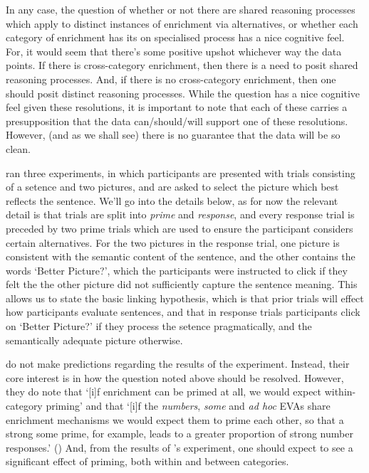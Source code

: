 \documentclass[10pt]{article}
\begin{document}
\begin{multicols}{2}
In any case, the question of whether or not there are shared reasoning processes which apply to distinct instances of enrichment via alternatives, or whether each category of enrichment has its on specialised process has a nice cognitive feel.
For, it would seem that there's some positive upshot whichever way the data points.
If there is cross-category enrichment, then there is a need to posit shared reasoning processes.
And, if there is no cross-category enrichment, then one should posit distinct reasoning processes.
While the question has a nice cognitive feel given these resolutions, it is important to note that each of these carries a presupposition that the data can/should/will support one of these resolutions.
However, (and as we shall see) there is no guarantee that the data will be so clean.

\citeauthor{Bott:2016aa} ran three experiments, in which participants are presented with trials consisting of a setence and two pictures, and are asked to select the picture which best reflects the sentence.
We'll go into the details below, as for now the relevant detail is that trials are split into \emph{prime} and \emph{response}, and every response trial is preceded by two prime trials which are used to ensure the participant considers certain alternatives.
For the two pictures in the response trial, one picture is consistent with the semantic content of the sentence, and the other contains the words `Better Picture?', which the participants were instructed to click if they felt the the other picture did not sufficiently capture the sentence meaning.
This allows us to state the basic linking hypothesis, which is that prior trials will effect how participants evaluate sentences, and that in response trials participants click on `Better Picture?' if they process the setence pragmatically, and the semantically adequate picture otherwise.

\citeauthor{Bott:2016aa} do not make predictions regarding the results of the experiment.
Instead, their core interest is in how the question noted above should be resolved.
However, they do note that `[i]f enrichment can be primed at all, we would expect within-category priming' and that `[i]f the \emph{numbers}, \emph{some} and \emph{ad hoc} EVAs share enrichment mechanisms we would expect them to prime each other, so that a strong some prime, for example, leads to a greater proportion of strong number responses.'
(\citeyear[122]{Bott:2016aa})
And, from the results of \citeauthor{Bott:2016aa}'s experiment, one should expect to see a significant effect of priming, both within and between categories.


\end{multicols}
\end{document}
